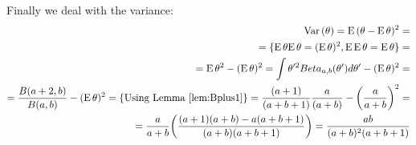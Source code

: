\documentclass[a4paper,twoside=false,abstract=false,numbers=noenddot,
titlepage=false,headings=small,parskip=half,version=last]{scrartcl}
\begin{document}
\begin{solution}
    Finally we deal with the variance: 
    \begin{equation}
        \begin{split}
            {\rm Var}\,(\theta)={\rm E}\,(\theta-{\rm E}\,\theta)^2= \\
            =\{{\rm E}\,\theta{\rm E}\,\theta=({\rm E}\,\theta)^2,
            {\rm E}\,{\rm E}\,\theta={\rm E}\,\theta\}= \\
            ={\rm E}\,\theta^2 - ({\rm E}\,\theta)^2=
            \int\theta'^2 Beta_{a,b}(\theta')d\theta' - ({\rm E}\,\theta)^2= \\
            = \frac{B(a+2,b)}{B(a,b)} - ({\rm E}\,\theta)^2 = \{\text{Using
            Lemma \ref{lem:Bplus1}}\}=
            \frac{(a+1)}{(a+b+1)}\frac{a}{(a+b)} - \bigg(\frac{a}{a+b}\bigg)^2 =
            \\
            = \frac{a}{a+b}\bigg(\frac{(a+1)(a+b)-a(a+b+1)}{(a+b)(a+b+1)}\bigg)
            = \frac{ab}{(a+b)^2(a+b+1)}
        \end{split}    
    \end{equation}

\end{solution}
\end{document}

